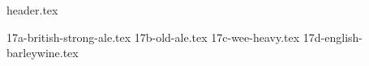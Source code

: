 \clearpage
{}
\divisorLine
{header.tex}
\begin{multicols*}{2}
{17a-british-strong-ale.tex}
{17b-old-ale.tex}
{17c-wee-heavy.tex}
{17d-english-barleywine.tex}
\end{multicols*}